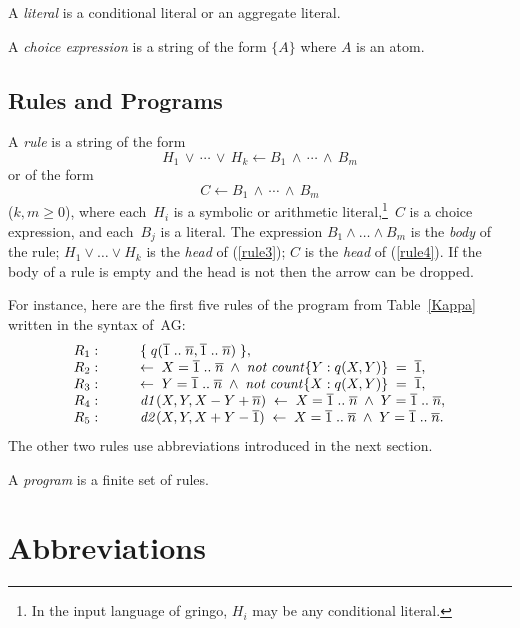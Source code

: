 \documentclass{tlp}
\def\ar{\leftarrow}
\def\beq{\begin{equation}}
\def\eeq#1{\label{#1}\end{equation}}
\def\ba{\begin{array}}
\def\ea{\end{array}}
\def\no{{\it not}}
\begin{document}
A {\sl literal} is a conditional literal or an aggregate literal.

A {\sl choice expression} is a string of the form $\{A\}$ where 
$A$ is an atom. 


\subsection{Rules and Programs} \label{rp}

A {\sl rule} is a string of the form
\beq
H_1\,\lor\,\cdots\,\lor\,H_k \ar B_1\,\land\,\cdots\,\land\,B_m
\eeq{rule3}
or of the form
\beq
C \ar B_1\,\land\,\cdots\,\land\,B_m
\eeq{rule4}
($k,m\geq 0$), where each~$H_i$ is a symbolic or arithmetic
literal,\footnote{In the input language of {\sc gringo}, $H_i$ may be any 
conditional literal.}~$C$ is a choice 
expression, and each~$B_j$ is a literal. 
The expression $B_1 \land \dots \land B_m$ is the 
{\sl body} of the rule; $H_1 \lor \dots \lor H_k$ is the {\sl head}  
of (\ref{rule3}); $C$ is the {\sl head} of (\ref{rule4}). 
If the body of a rule is empty and the head is not then the arrow can be 
dropped. %

For instance, here are the first five rules of the program from
Table~\ref{Kappa} written in the syntax of~AG:
$$
\ba {ll}
  R_1: \qquad  & \{\; q(\overline 1\;..\;\overline n,\overline 1\;..\;\overline n)\; \},\\
  R_2: \qquad  & \ar \; X = \overline 1\;..\;\overline n \; \land \; \no \; {\it count}\{ Y : q(X,Y) \}\;
= \; \overline 1,\\
  R_3: \qquad  & \ar \; Y = \overline 1\;..\;\overline n \; \land \; \no \; {\it count}\{ X : q(X,Y) \}\;
= \; \overline 1,\\
  R_4: \qquad  & {\it d1}(X,Y,X-Y+\overline n) \; \ar \; X = \overline 1\;..\;\overline n \; \land \; 
Y = \overline 1\;..\;\overline n,\\
  R_5: \qquad  & {\it d2}(X,Y,X+Y-\overline 1) \; \ar \; X = \overline 1\;..\;\overline n \; \land \; 
Y = \overline 1\;..\;\overline n.
\ea
$$
The other two rules use abbreviations introduced in the next section.

A {\sl program} is a finite set of rules.

\section{Abbreviations}\label{abb}
\end{document}
